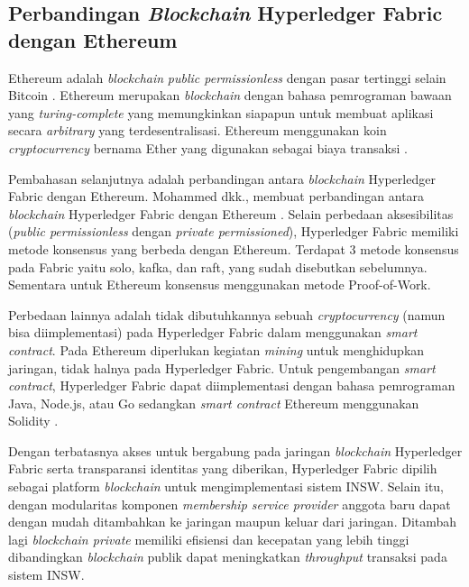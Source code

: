 \subsection{Perbandingan \textit{Blockchain} Hyperledger Fabric dengan Ethereum}

Ethereum adalah \textit{blockchain} \textit{public permissionless} dengan pasar tertinggi selain Bitcoin \citep{Yaga2018}. Ethereum merupakan \textit{blockchain} dengan bahasa pemrograman bawaan yang \textit{turing-complete} yang memungkinkan siapapun untuk membuat aplikasi secara \textit{arbitrary} yang terdesentralisasi. Ethereum menggunakan koin \textit{cryptocurrency} bernama Ether yang digunakan sebagai biaya transaksi \citep{buterin2014next}.

Pembahasan selanjutnya adalah perbandingan antara \textit{blockchain} Hyperledger Fabric dengan Ethereum. Mohammed dkk., membuat perbandingan antara \textit{blockchain} Hyperledger Fabric dengan Ethereum \citep{Mohammed2021}. Selain perbedaan aksesibilitas (\textit{public permissionless} dengan \textit{private permissioned}), Hyperledger Fabric memiliki metode konsensus yang berbeda dengan Ethereum. Terdapat 3 metode konsensus pada Fabric yaitu solo, kafka, dan raft, yang sudah disebutkan sebelumnya. Sementara untuk Ethereum konsensus menggunakan metode Proof-of-Work. 

Perbedaan lainnya adalah tidak dibutuhkannya sebuah \textit{cryptocurrency} (namun bisa diimplementasi) pada Hyperledger Fabric dalam menggunakan \textit{smart contract}. Pada Ethereum diperlukan kegiatan \textit{mining} untuk menghidupkan jaringan, tidak halnya pada Hyperledger Fabric. Untuk pengembangan \textit{smart contract}, Hyperledger Fabric dapat diimplementasi dengan bahasa pemrograman Java, Node.js, atau Go sedangkan \textit{smart contract} Ethereum menggunakan Solidity \citep{Mohammed2021}.

Dengan terbatasnya akses untuk bergabung pada jaringan \textit{blockchain} Hyperledger Fabric serta transparansi identitas yang diberikan, Hyperledger Fabric dipilih sebagai platform \textit{blockchain} untuk mengimplementasi sistem INSW. Selain itu, dengan modularitas komponen \textit{membership service provider} anggota baru dapat dengan mudah ditambahkan ke jaringan maupun keluar dari jaringan. Ditambah lagi \textit{blockchain private} memiliki efisiensi dan kecepatan yang lebih tinggi dibandingkan \textit{blockchain} publik  \citep{Ahmad2021} dapat meningkatkan \textit{throughput} transaksi pada sistem INSW.

